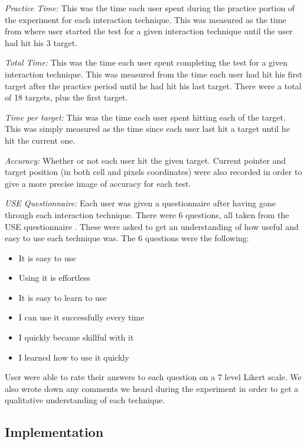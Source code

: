 \textit{Practice Time:} This was the time each user spent during the practice portion of the experiment for each interaction technique. 
This was measured as the time from where user started the test for a given interaction technique until the user had hit his 3 target. 

\textit{Total Time:} This was the time each user spent completing the test for a given interaction technique. 
This was measured from the time each user had hit his first target after the practice period until he had hit his last target. 
There were a total of 18 targets, plus the first target. 

\textit{Time per target:} This was the time each user spent hitting each of the target. 
This was simply measured as the time since each user last hit a target until he hit the current one.

\textit{Accuracy:} Whether or not each user hit the given target. 
Current pointer and target position (in both cell and pixels coordinates) were also recorded in order to give a more precise image of accuracy for each test. 

\textit{USE Questionnaire:} Each user was given a questionnaire after having gone through each interaction technique. 
There were 6 questions, all taken from the USE questionnaire \cite{lund2001measuring}. 
These were asked to get an understanding of how useful and easy to use each technique was. 
The 6 questions were the following: 

\begin{itemize}
	\item It is easy to use
	\item Using it is effortless
	\item It is easy to learn to use
	\item I can use it successfully every time
	\item I quickly became skillful with it
	\item I learned how to use it quickly
\end{itemize}

User were able to rate their answers to each question on a 7 level Likert scale. 
We also wrote down any comments we heard during the experiment in order to get a qualitative understanding of each technique.  

\subsection{Implementation}


